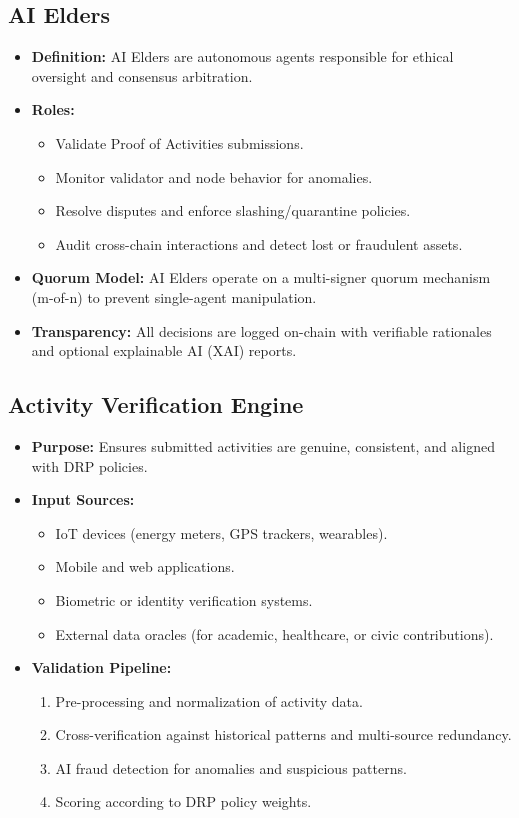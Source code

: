 \documentclass[11pt,a4paper]{article}
\begin{document}
\subsection{AI Elders}
\begin{itemize}
    \item \textbf{Definition:} AI Elders are autonomous agents responsible for ethical oversight and consensus arbitration.  
    \item \textbf{Roles:}  
        \begin{itemize}
            \item Validate Proof of Activities submissions.  
            \item Monitor validator and node behavior for anomalies.  
            \item Resolve disputes and enforce slashing/quarantine policies.  
            \item Audit cross-chain interactions and detect lost or fraudulent assets.  
        \end{itemize}
    \item \textbf{Quorum Model:} AI Elders operate on a multi-signer quorum mechanism (m-of-n) to prevent single-agent manipulation.  
    \item \textbf{Transparency:} All decisions are logged on-chain with verifiable rationales and optional explainable AI (XAI) reports.  
\end{itemize}

\subsection{Activity Verification Engine}
\begin{itemize}
    \item \textbf{Purpose:} Ensures submitted activities are genuine, consistent, and aligned with DRP policies.  
    \item \textbf{Input Sources:}  
        \begin{itemize}
            \item IoT devices (energy meters, GPS trackers, wearables).  
            \item Mobile and web applications.  
            \item Biometric or identity verification systems.  
            \item External data oracles (for academic, healthcare, or civic contributions).  
        \end{itemize}
    \item \textbf{Validation Pipeline:}  
        \begin{enumerate}
            \item Pre-processing and normalization of activity data.  
            \item Cross-verification against historical patterns and multi-source redundancy.  
            \item AI fraud detection for anomalies and suspicious patterns.  
            \item Scoring according to DRP policy weights.  
        \end{enumerate}
\end{itemize}
\end{document}
